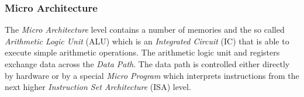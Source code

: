 %
%
%
%
%
%
%

\subsubsection{Micro Architecture}
\label{micro_architecture_heading}

The \emph{Micro Architecture} level contains a number of memories and the so
called \emph{Arithmetic Logic Unit} (ALU) which is an \emph{Integrated Circuit}
(IC) that is able to execute simple arithmetic operations. The arithmetic logic
unit and registers exchange data across the \emph{Data Path}. The data path is
controlled either directly by hardware or by a special \emph{Micro Program}
which interprets instructions from the next higher
\emph{Instruction Set Architecture} (ISA) level.
